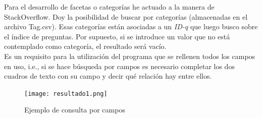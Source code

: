 Para el desarrollo de facetas o categorías he actuado a la manera de StackOverflow. Doy la posibilidad de buscar por categorías (almacenadas en el archivo Tag.csv). Esas categorías están asociadas a un \textit{ID-q} que luego busco sobre el índice de preguntas. Por supuesto, si se introduce un valor que no está contemplado como categoría, el resultado será vacío.
\\

Es un requisito para la utilización del programa que se rellenen todos los campos en uso, i.e., si se hace búsqueda por campos es necesario completar los dos cuadros de texto con su campo y decir qué relación hay entre ellos.

\begin{figure}[H] %
	\centering
	\texttt{[image: resultado1.png]}  %
	\caption{Ejemplo de consulta por campos} 
\end{figure}

